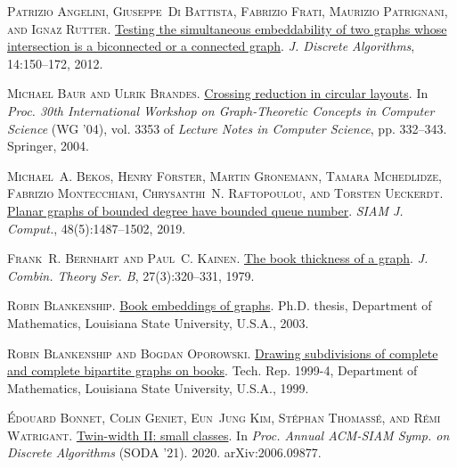 \documentclass[kpfonts]{patmorin}
\begin{document}
	\textsc{Patrizio Angelini, Giuseppe~Di Battista, Fabrizio Frati, Maurizio
		Patrignani, and Ignaz Rutter}.
	\newblock \href{https://doi.org/10.1016/j.jda.2011.12.015}{Testing the
		simultaneous embeddability of two graphs whose intersection is a biconnected
		or a connected graph}.
	\newblock \emph{J. Discrete Algorithms}, 14:150--172, 2012.
	
	\textsc{Michael Baur and Ulrik Brandes}.
	\newblock \href{https://doi.org/10.1007/978-3-540-30559-0\_28}{Crossing
		reduction in circular layouts}.
	\newblock In \emph{Proc. 30th International Workshop on Graph-Theoretic
		Concepts in Computer Science} (WG '04), vol. 3353 of \emph{Lecture Notes in
		Computer Science}, pp. 332--343. Springer, 2004.
	
	\textsc{Michael~A. Bekos, Henry F{\"{o}}rster, Martin Gronemann, Tamara
		Mchedlidze, Fabrizio Montecchiani, Chrysanthi~N. Raftopoulou, and Torsten
		Ueckerdt}.
	\newblock \href{https://doi.org/10.1137/19M125340X}{Planar graphs of bounded
		degree have bounded queue number}.
	\newblock \emph{SIAM J. Comput.}, 48(5):1487--1502, 2019.
	
	\textsc{Frank~R. Bernhart and Paul~C. Kainen}.
	\newblock \href{https://doi.org/10.1016/0095-8956(79)90021-2}{The book
		thickness of a graph}.
	\newblock \emph{J. Combin. Theory Ser. B}, 27(3):320--331, 1979.
	
	\textsc{Robin Blankenship}.
	\newblock
	\href{http://etd.lsu.edu/docs/available/etd-0709103-163907/unrestricted/Blankenship_dis.pdf}{Book
		embeddings of graphs}.
	\newblock Ph.D. thesis, Department of Mathematics, Louisiana State University,
	U.S.A., 2003.
	
	\textsc{Robin Blankenship and Bogdan Oporowski}.
	\newblock \href{http://www.math.lsu.edu/~preprint/1999/rbbo991.ps}{Drawing
		subdivisions of complete and complete bipartite graphs on books}.
	\newblock Tech. Rep. 1999-4, Department of Mathematics, Louisiana State
	University, U.S.A., 1999.
	
	\textsc{\'Edouard Bonnet, Colin Geniet, Eun~Jung Kim, St\'ephan Thomass\'e, and
		R\'emi Watrigant}.
	\newblock \href{http://arxiv.org/abs/2006.09877}{Twin-width {II}: small
		classes}.
	\newblock In \emph{Proc. Annual ACM-SIAM Symp. on Discrete Algorithms} (SODA
		'21). 2020{}.
	\newblock arXiv:2006.09877.
	
\end{document}
